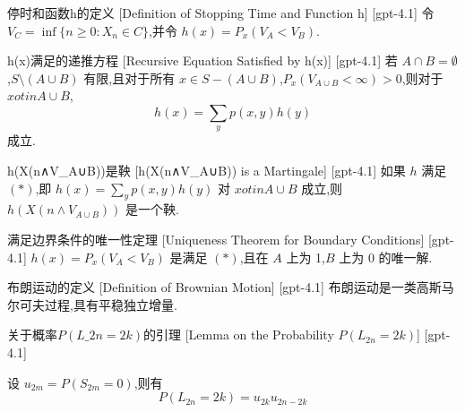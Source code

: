 \documentclass[UTF8]{ctexart}
\begin{document}
    
    
    \begin{dfn}
        {停时和函数h的定义}
        [Definition of Stopping Time and Function h]
        [gpt-4.1]
        令 $V_{C} = \operatorname*{inf} \{ n \geq 0 : X_{n} \in C \}$,并令 $h(x) = P_{x}(V_{A} < V_{B})$.
    \end{dfn}
    
    
    
    \begin{thm}
        {h(x)满足的递推方程}
        [Recursive Equation Satisfied by h(x)]
        [gpt-4.1]
        若 $A \cap B = \emptyset$,$S \setminus (A \cup B)$ 有限,且对于所有 $x \in S - (A \cup B)$,$P_{x}(V_{A \cup B} < \infty) > 0$,则对于 $x 
otin A \cup B$,
\[
h(x) = \sum_{y} p(x, y) h(y)
\]
成立.
    \end{thm}
    
    
    
    \begin{thm}
        {h(X(n∧V\_{A∪B}))是鞅}
        [h(X(n∧V_{A∪B})) is a Martingale]
        [gpt-4.1]
        如果 $h$ 满足 $(*)$,即 $h(x) = \sum_{y} p(x, y) h(y)$ 对 $x 
otin A \cup B$ 成立,则 $h(X(n \land V_{A\cup B}))$ 是一个鞅.
    \end{thm}
    
    
    
    \begin{thm}
        {满足边界条件的唯一性定理}
        [Uniqueness Theorem for Boundary Conditions]
        [gpt-4.1]
        $h(x) = P_{x}(V_{A} < V_{B})$ 是满足 $(*)$,且在 $A$ 上为 1,$B$ 上为 0 的唯一解.
    \end{thm}
    
    
    
    \begin{dfn}
        {布朗运动的定义}
        [Definition of Brownian Motion]
        [gpt-4.1]
        布朗运动是一类高斯马尔可夫过程,具有平稳独立增量.
    \end{dfn}
    
    
    
    \begin{lma}
        [Lemma-on-the-Probability-$PL-{2n}-=-2k$]
        {关于概率$P(L\_{2n} = 2k)$的引理}
        [Lemma on the Probability $P(L_{2n} = 2k)$]
        [gpt-4.1]
        
设 $u_{2m} = P(S_{2m} = 0)$,则有
\[
P(L_{2n} = 2k) = u_{2k} u_{2n-2k}
\]

    \end{lma}
    
\end{document}
